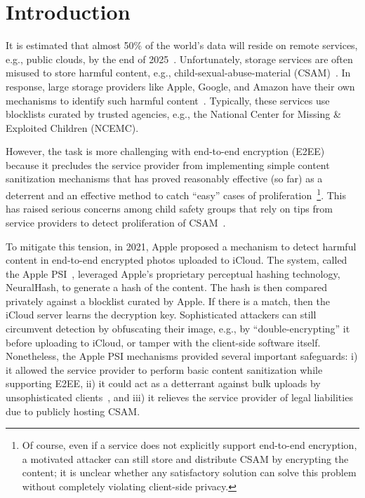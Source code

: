 \section{Introduction}
%


It is estimated that almost 50\% of the world's data will reside on
remote services, e.g., public clouds, by the end of 2025~\cite{public_storage_vol}. 
Unfortunately, storage services are often misused to store harmful
content, e.g., child-sexual-abuse-material (CSAM)~\cite{williams2022csam}. In response,
large storage providers like Apple, Google, and Amazon have their own
mechanisms to identify such harmful content~\cite{apple2021csam,
  googleCSAM, amazonCSAM}. Typically, these services use blocklists curated by trusted agencies, e.g., the National Center for Missing \& Exploited Children (NCEMC). 


However, the task is more challenging with end-to-end encryption (E2EE)~\cite{content_mod_e2ee} because it precludes the service provider from implementing simple content sanitization mechanisms that has proved reasonably effective (so far) as a deterrent and an effective method to catch ``easy'' cases of proliferation~\cite{}\footnote{Of course, even if a service does not explicitly support end-to-end encryption, a motivated attacker can still store and distribute CSAM by encrypting the content; it is unclear whether any satisfactory solution can solve this problem without completely violating client-side privacy.}. This has raised serious concerns among child safety groups that rely on tips from service providers to detect proliferation of CSAM~\cite{}. 

To mitigate this tension, in 2021, Apple proposed a mechanism  
to detect harmful content in end-to-end encrypted photos uploaded to iCloud. The system, called the Apple PSI~\cite{bhowmick2021apple}, leveraged Apple's proprietary perceptual hashing technology, NeuralHash, to generate a hash of the content. The hash is then compared privately against a blocklist curated by Apple. 
If there is a match, then the iCloud server learns the decryption key. Sophisticated attackers can still circumvent detection by obfuscating their image, e.g., by ``double-encrypting'' it before uploading to iCloud, or tamper with the client-side software itself. Nonetheless, the Apple PSI mechanisms provided several important safeguards: i) it allowed the service provider to perform basic content sanitization while supporting E2EE, ii) it could act as a detterrant against bulk uploads by unsophisticated clients~\cite{}, and iii) it relieves the service provider of legal liabilities due to publicly hosting CSAM. 

